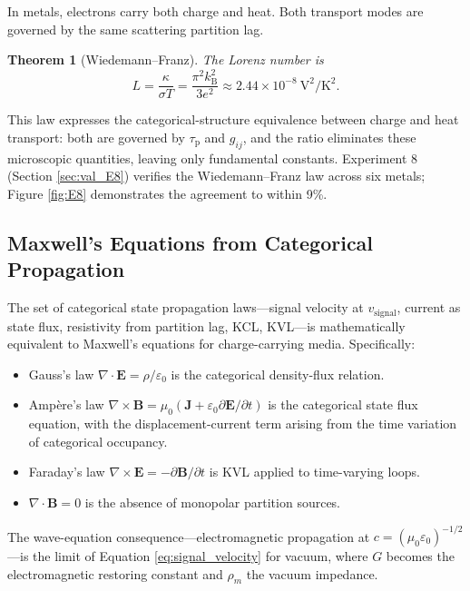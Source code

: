 \documentclass[twocolumn,10pt,a4paper]{article}
\newtheorem{theorem}{Theorem}[section]
\theoremstyle{definition}
\theoremstyle{remark}
\newcommand{\kB}{k_{\mathrm{B}}}
\newcommand{\tauP}{\tau_{\mathrm{p}}}
\begin{document}
In metals, electrons carry both charge and heat. Both transport modes are governed by the same scattering partition lag.

\begin{theorem}[Wiedemann--Franz]
\label{thm:wf}
The Lorenz number is
\begin{equation}
L = \frac{\kappa}{\sigma T} = \frac{\pi^2 \kB^2}{3 e^2} \approx 2.44\times10^{-8}~\mathrm{V^2/K^2}.
\label{eq:wf}
\end{equation}
\end{theorem}

This law \citep{wiedemann1853,lorenz1872,sommerfeld1928} expresses the categorical-structure equivalence between charge and heat transport: both are governed by $\tauP$ and $g_{ij}$, and the ratio eliminates these microscopic quantities, leaving only fundamental constants. Experiment 8 (Section \ref{sec:val_E8}) verifies the Wiedemann--Franz law across six metals; Figure \ref{fig:E8} demonstrates the agreement to within 9\%.

\subsection{Maxwell's Equations from Categorical Propagation}

The set of categorical state propagation laws---signal velocity at $v_{\mathrm{signal}}$, current as state flux, resistivity from partition lag, KCL, KVL---is mathematically equivalent to Maxwell's equations \citep{maxwell1873,jackson1999} for charge-carrying media. Specifically:

\begin{itemize}[leftmargin=1.2em,nosep]
\item Gauss's law $\nabla \cdot \mathbf{E} = \rho/\varepsilon_0$ is the categorical density-flux relation.
\item Ampère's law $\nabla\times\mathbf{B} = \mu_0(\mathbf{J} + \varepsilon_0 \partial\mathbf{E}/\partial t)$ is the categorical state flux equation, with the displacement-current term arising from the time variation of categorical occupancy.
\item Faraday's law $\nabla\times\mathbf{E} = -\partial\mathbf{B}/\partial t$ is KVL applied to time-varying loops.
\item $\nabla\cdot\mathbf{B} = 0$ is the absence of monopolar partition sources.
\end{itemize}

The wave-equation consequence---electromagnetic propagation at $c = (\mu_0\varepsilon_0)^{-1/2}$---is the limit of Equation \eqref{eq:signal_velocity} for vacuum, where $G$ becomes the electromagnetic restoring constant and $\rho_m$ the vacuum impedance.
\end{document}

